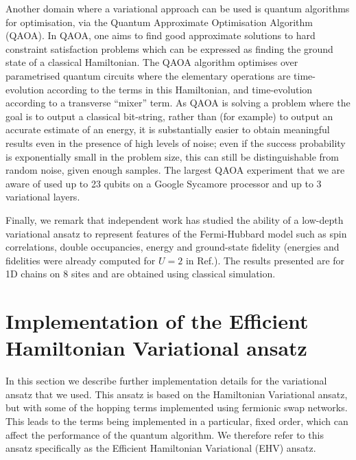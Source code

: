 \documentclass[aps,prb,twoside,superscriptaddress,longbibliography,nofootinbib,floatfix, notitlepage,twocolumn]{revtex4-1}
\begin{document}
Another domain where a variational approach can be used is quantum algorithms for optimisation, via the Quantum Approximate Optimisation Algorithm\cite{farhi14} (QAOA). In QAOA, one aims to find good approximate solutions to hard constraint satisfaction problems which can be expressed as finding the ground state of a classical Hamiltonian. The QAOA algorithm optimises over parametrised quantum circuits where the elementary operations are time-evolution according to the terms in this Hamiltonian, and time-evolution according to a transverse ``mixer'' term. As QAOA is solving a problem where the goal is to output a classical bit-string, rather than (for example) to output an accurate estimate of an energy, it is substantially easier to obtain meaningful results even in the presence of high levels of noise; even if the success probability is exponentially small in the problem size, this can still be distinguishable from random noise, given enough samples. The largest QAOA experiment that we are aware of used up to 23 qubits on a Google Sycamore processor and up to 3 variational layers\cite{harrigan21}.

Finally, we remark that independent work\cite{martin2021variational} has studied the ability of a low-depth variational ansatz to represent features of the Fermi-Hubbard model such as spin correlations, double occupancies, energy and ground-state fidelity (energies and fidelities were already computed for $U=2$ in Ref.\cite{cade20}). The results presented are for 1D chains on 8 sites and are obtained using classical simulation.

\section{Implementation of the Efficient Hamiltonian Variational ansatz}
\label{app:ansatz}

In this section we describe further implementation details for the variational ansatz that we used. This ansatz is based on the Hamiltonian Variational ansatz\cite{wecker15}, but with some of the hopping terms implemented using fermionic swap networks. This leads to the terms being implemented in a particular, fixed order, which can affect the performance of the quantum algorithm\cite{cade20}. We therefore refer to this ansatz specifically as the Efficient Hamiltonian Variational (EHV) ansatz.
\end{document}
